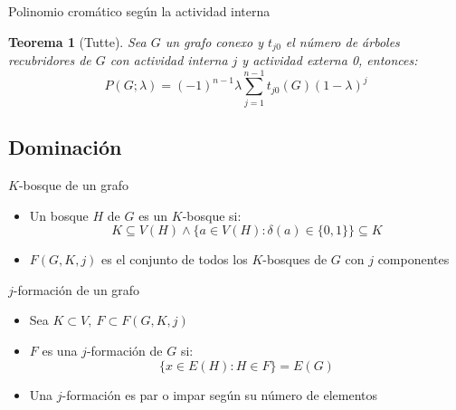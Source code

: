 \documentclass{beamer}
\newtheorem*{thm}{Teorema}
\begin{document}
\begin{frame}{Polinomio cromático según la actividad interna}
    \begin{thm}[Tutte]
        Sea $G$ un grafo conexo y $t_{j0}$ el número de árboles recubridores de $G$ con actividad interna $j$ y actividad externa 0, entonces:
        \begin{equation*}
            P(G; \lambda) = (-1)^{n-1}\lambda \sum_{j=1}^{n-1} t_{j0}(G)(1-\lambda)^j
        \end{equation*}
    \end{thm}
\end{frame}

\subsection{Dominación}

\begin{frame}{$K$-bosque de un grafo}
    \begin{itemize}
        \item Un bosque $H$ de $G$ es un $K$-bosque si:
        \begin{equation*}
            K \subseteq V(H) \land \{a \in V(H) : \delta(a) \in \{0, 1\}\} \subseteq K
        \end{equation*}
        \item $F(G, K, j)$ es el conjunto de todos los $K$-bosques de $G$ con $j$ componentes
    \end{itemize}
\end{frame}

\begin{frame}{$j$-formación de un grafo}
    \begin{itemize}
        \item Sea $K \subset V,\ F \subset F(G, K, j)$
        \item $F$ es una $j$-formación de $G$ si:
        \begin{equation*}
            \{x \in E(H) : H \in F\} = E(G)
        \end{equation*}
        \item Una $j$-formación es par o impar según su número de elementos
    \end{itemize}
\end{frame}
\end{document}
